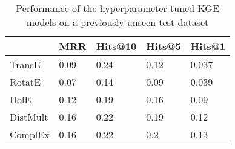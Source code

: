 \begin{table}[!ht]
    \centering
    \begin{tabular}{|l|l|l|l|l|}
        \hline
        & MRR & Hits@10 &  Hits@5 &  Hits@1 \\ \hline
        TransE & 0.09   & 0.24 & 0.12 & 0.037 \\ \hline
        RotatE & 0.07   & 0.14 & 0.09 & 0.039 \\ \hline
        HolE & 0.12     &  0.19 & 0.16 & 0.09 \\ \hline
        DistMult & 0.16 & 0.22 & 0.19 & 0.12 \\ \hline
        ComplEx & 0.16  & 0.22 & 0.2 & 0.13 \\ \hline
    \end{tabular}
    \caption{Performance of the hyperparameter tuned KGE models on a previously unseen test dataset}
    \label{tab:kge-new-res}
\end{table}